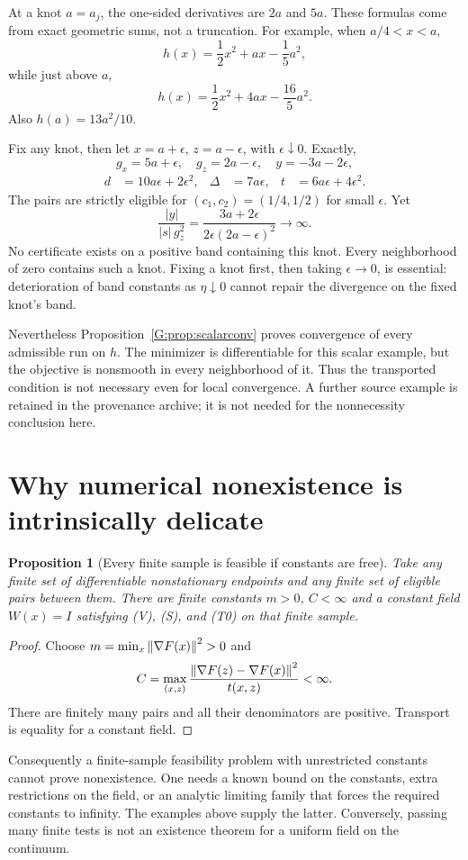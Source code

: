 \documentclass[10pt,oneside,openany]{book}
\newtheorem{proposition}{Proposition}[chapter]
\theoremstyle{remark}\newtheorem{remark}{Remark}[chapter]
\begin{document}
At a knot $a=a_j$, the one-sided derivatives are $2a$ and $5a$. These formulas come from exact geometric sums, not a truncation. For example, when $a/4<x<a$,
\[
 h(x)=\frac12x^2+ax-\frac15a^2,
\]
while just above $a$,
\[
 h(x)=\frac12x^2+4ax-\frac{16}{5}a^2.
\]
Also $h(a)=13a^2/10$.

Fix any knot, then let $x=a+\epsilon$, $z=a-\epsilon$, with $\epsilon\downarrow0$. Exactly,
\[
 g_x=5a+\epsilon,\quad g_z=2a-\epsilon,\quad y=-3a-2\epsilon,
\]
\begin{align*}
 d&=10a\epsilon+2\epsilon^2,&
 \Delta&=7a\epsilon,&
 t&=6a\epsilon+4\epsilon^2.
\end{align*}
The pairs are strictly eligible for $(c_1,c_2)=(1/4,1/2)$ for small $\epsilon$. Yet
\[
 \frac{|y|}{|s|\,g_z^2}
 =\frac{3a+2\epsilon}{2\epsilon(2a-\epsilon)^2}\longrightarrow\infty.
\]
No certificate exists on a positive band containing this knot. Every neighborhood of zero contains such a knot. Fixing a knot first, then taking $\epsilon\to0$, is essential: deterioration of band constants as $\eta\downarrow0$ cannot repair the divergence on the fixed knot's band.

Nevertheless Proposition~\ref{G:prop:scalarconv} proves convergence of every admissible run on $h$. The minimizer is differentiable for this scalar example, but the objective is nonsmooth in every neighborhood of it. Thus the transported condition is not necessary even for local convergence. A further source example is retained in the provenance archive; it is not needed for the nonnecessity conclusion here.


\setcounter{section}{8}
\setcounter{theorem}{0}
\setcounter{equation}{8}
\section{Why numerical nonexistence is intrinsically delicate}
\begin{proposition}[Every finite sample is feasible if constants are free]
Take any finite set of differentiable nonstationary endpoints and any finite set of eligible pairs between them. There are finite constants $m>0$, $C<\infty$ and a constant field $W(x)=I$ satisfying (V), (S), and (T0) on that finite sample.
\end{proposition}
\begin{proof}
Choose $m=\min_x\left\lVert\nabla F(x)\right\rVert^2>0$ and
\[
 C=\max_{(x,z)}\frac{\left\lVert\nabla F(z)-\nabla F(x)\right\rVert^2}{t(x,z)}<\infty.
\]
There are finitely many pairs and all their denominators are positive. Transport is equality for a constant field.
\end{proof}
Consequently a finite-sample feasibility problem with unrestricted constants cannot prove nonexistence. One needs a known bound on the constants, extra restrictions on the field, or an analytic limiting family that forces the required constants to infinity. The examples above supply the latter. Conversely, passing many finite tests is not an existence theorem for a uniform field on the continuum.
\end{document}
